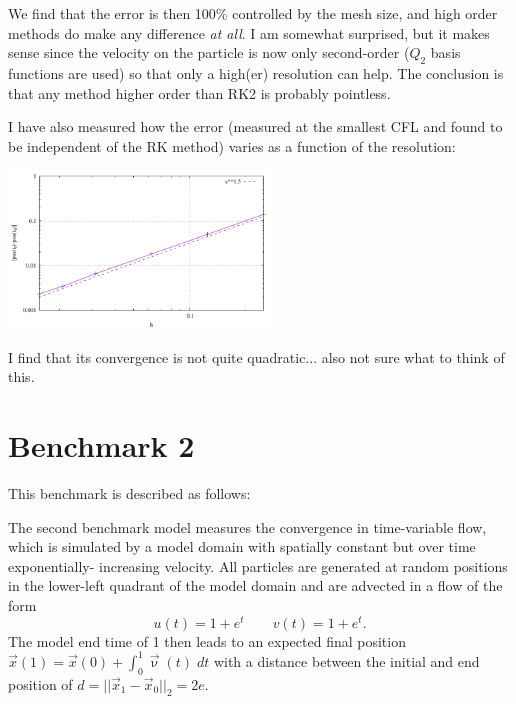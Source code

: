 We find that the error is then 100\% controlled by the mesh size, and high order methods do 
make any difference {\it at all}.
I am somewhat surprised, but it makes sense since the velocity on the particle is now 
only second-order ($Q_2$ basis functions are used) so that only a high(er) resolution can help.
The conclusion is that any method higher order than RK2 is probably pointless. 

I have also measured how the error (measured at the smallest CFL and found to be 
independent of the RK method) varies as a function of the resolution:
\begin{center}
\includegraphics[width=7cm]{python_codes/fieldstone_122/results/res.pdf}
\end{center}
I find that its convergence is not quite quadratic... also not sure 
what to think of this. 






\newpage
\section*{Benchmark 2}

This benchmark is described as follows:
\begin{displayquote}
{\color{darkgray}
The second benchmark model measures the convergence
in time-variable flow, which is simulated by a model domain 
with spatially constant but over time exponentially-
increasing velocity. All particles are generated at random
positions in the lower-left quadrant of the model domain
and are advected in a flow of the form
\[
u(t)=1 + e^t \qquad 
v(t)=1 + e^t. 
\]
The model end time
of 1 then leads to an expected final
position $\vec{x}(1) = \vec{x}(0) + \int_0^1 \vec\upnu(t) \; dt$
 with a distance between the initial and end position of $d = ||\vec{x}_1-\vec{x}_0 ||_2 = 2e$.}
\end{displayquote}








